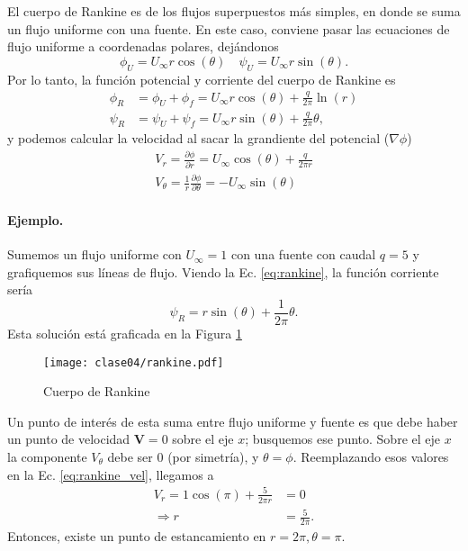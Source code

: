 El cuerpo de Rankine es de los flujos superpuestos más simples, en donde se suma un flujo uniforme con una fuente.
En este caso, conviene pasar las ecuaciones de flujo uniforme a coordenadas polares, dejándonos
%
\begin{equation}
\phi_U = U_\infty r\cos(\theta) \quad \psi_U = U_\infty r\sin(\theta).
\end{equation}
%
Por lo tanto, la función potencial y corriente del cuerpo de Rankine es
%
\begin{align}\label{eq:rankine}
\phi_R &= \phi_U+\phi_f = U_\infty r\cos(\theta) + \frac{q}{2\pi}\ln(r)\nonumber\\
\psi_R &= \psi_U+\psi_f = U_\infty r\sin(\theta) + \frac{q}{2\pi}\theta,
\end{align}
%
y podemos calcular la velocidad al sacar la grandiente del potencial ($\nabla\phi$)
%
\begin{align}\label{eq:rankine_vel}
V_r = \frac{\partial\phi}{\partial r} = U_\infty\cos(\theta) + \frac{q}{2\pi r} \nonumber\\
V_\theta = \frac{1}{r}\frac{\partial\phi}{\partial\theta} = -U_\infty\sin(\theta)
\end{align}

\paragraph{Ejemplo.}
Sumemos un flujo uniforme con $U_\infty=1$ con una fuente con caudal $q=5$ y grafiquemos sus líneas de flujo.
Viendo la Ec. \eqref{eq:rankine}, la función corriente sería
%
\begin{equation}\label{eq:rankine_ej}
\psi_R = r\sin(\theta)+\frac{1}{2\pi}\theta.
\end{equation}
%
Esta solución está graficada en la Figura \ref{fig:rankine}
%
\begin{figure}[h!]
\centering
\texttt{[image: clase04/rankine.pdf]}
\caption{Cuerpo de Rankine}
\label{fig:rankine}
\end{figure}

Un punto de interés de esta suma entre flujo uniforme y fuente es que debe haber un punto de velocidad $\mathbf{V}=0$ sobre el eje $x$; busquemos ese punto.
Sobre el eje $x$ la componente $V_\theta$ debe ser 0 (por simetría), y $\theta=\phi$.
Reemplazando esos valores en la Ec. \eqref{eq:rankine_vel}, llegamos a
%
\begin{align}
V_r = 1\cos(\pi) + \frac{5}{2\pi r} &= 0\nonumber\\
\Rightarrow r &= \frac{5}{2\pi}.
\end{align}
%
Entonces, existe un punto de estancamiento en $r=2\pi, \theta=\pi$.

